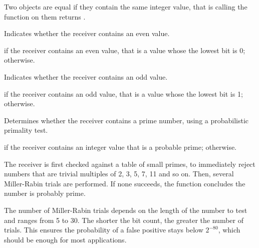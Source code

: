 \docdiscuss

Two  objects are equal if they contain the same integer value, that is calling the  function on them returns .



Indicates whether the receiver contains an even value.


\docretval

 if the receiver contains an even value, that is a value whose the lowest bit is 0;  otherwise.



Indicates whether the receiver contains an odd value.


\docretval

 if the receiver contains an odd value, that is a value whose the lowest bit is 1;  otherwise.



Determines whether the receiver contains a prime number, using a probabilistic primality test.


\docretval

 if the receiver contains an integer value that is a probable prime;  otherwise.

\docdiscuss

The receiver is first checked against a table of small primes, to immediately reject numbers that are trivial multiples of 2, 3, 5, 7, 11 and so on. Then, several Miller-Rabin trials are performed. If none succeeds, the function concludes the number is probably prime.

The number of Miller-Rabin trials depends on the length of the number to test and ranges from 5 to 30. The shorter the bit count, the greater the number of trials. This ensures the probability of a false positive stays below $2^{-80}$, which should be enough for most applications.


